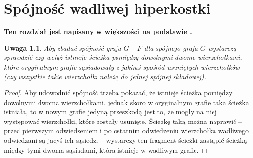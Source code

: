 \documentclass{pracamgr}
\newtheorem{remark}[theorem]{Uwaga}
\begin{document}
 \chapter{Spójność wadliwej hiperkostki}
  \textbf{Ten rozdział jest napisany w większości na podstawie \cite{DFGKR}.}
  \begin{remark}\label{spojnosc przy usunietych}
   Aby zbadać spójność grafu $G-F$ dla spójnego grafu $G$ wystarczy sprawdzić czy wciąż istnieje ścieżka pomiędzy dowolnymi dwoma wierzchołkami,
   które oryginalnym grafie sąsiadowały z jakimś spośród usuniętych wierzchołków (czy wszystkie takie wierzchołki należą do jednej spójnej składowej).
  \end{remark}
  \begin{proof}
   Aby udowodnić spójność trzeba pokazać, że istnieje ścieżka pomiędzy dowolnymi dwoma wierzchołkami, jednak skoro w oryginalnym grafie taka ścieżka istniała,
   to w nowym grafie jedyną przeszkodą jest to, że mogły na niej występować wierzchołki, które zostały usunięte. 
   Ścieżkę taką można naprawić -- przed pierwszym odwiedzeniem i po ostatnim odwiedzeniu wierzchołka wadliwego odwiedzani są jacyś ich sąsiedzi --
   wystarczy ten fragment ścieżki zastąpić ścieżką między tymi dwoma sąsiadami, która istnieje w wadliwym grafie.
  \end{proof}
\end{document}
